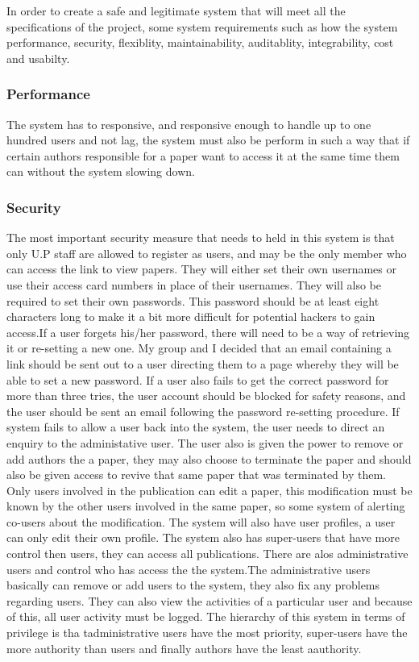 \documentclass[a4paper,12pt]{report}
\begin{document}
In order to create a safe and legitimate system that will meet all the specifications of the project, some system requirements such as how the system performance, security, flexiblity, maintainability, auditablity, integrability, cost and usabilty.

\subsubsection{Performance} 

The system has to responsive, and responsive enough to handle up to one hundred users and not lag, the system must also be perform in such a way that if certain authors responsible for a paper want to access it at the same time them can without the system slowing down.

\subsubsection{Security}
The most important security measure that needs to held in this system is that only U.P staff are allowed to register as users, and may be the only member who can access the link to view papers. They will either set their own usernames or use their access card numbers in place of their usernames. They will also be required to set their own passwords. This password should be at least eight characters long to make it a bit more difficult for potential hackers to gain access.If a user forgets his/her password, there will need to be a way of retrieving it or re-setting a new one. My group and I decided that an email containing a link should be sent out to a user directing them to a page whereby they will be able to set a new password. If a user also fails to get the correct password for more than three tries, the user account should be blocked for safety reasons, and the user should be sent an email following the password re-setting procedure. If system fails to allow a user back into the system, the user needs to direct an enquiry to the administative user.
The user also is given the power to remove or add authors the a paper, they may also choose to terminate the paper and should also be given access to revive that same paper that was terminated by them. Only users involved in the publication can edit a paper, this modification must be known by the other users involved in the same paper, so some system of alerting co-users about the modification. The system will also have user profiles, a user can only edit their own profile. The system also has super-users that have more control then users, they can access all publications. There are alos administrative users and control who has access the the system.The administrative users basically can  remove or add users to the system, they also fix any problems regarding users. They can also view the activities of a particular user and because of this, all user activity must be logged. The hierarchy of this system in terms of privilege is tha tadministrative users have the most priority, super-users have the more authority than users and finally authors have the least aauthority.
\end{document}
